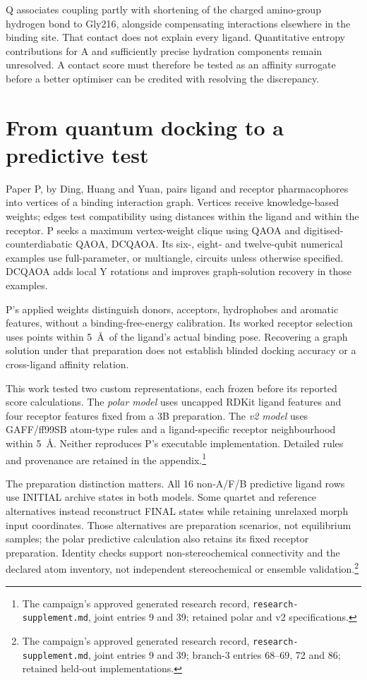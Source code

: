 \documentclass{article}
\newcommand{\rr}[1]{\footnote{The campaign's approved generated research record, \texttt{research-supplement.md}, #1.}}
\begin{document}
Q associates coupling partly with shortening of the charged amino-group hydrogen bond to Gly216, alongside compensating interactions elsewhere in the binding site. That contact does not explain every ligand. Quantitative entropy contributions for A and sufficiently precise hydration components remain unresolved. A contact score must therefore be tested as an affinity surrogate before a better optimiser can be credited with resolving the discrepancy.\cite{Q}

\section{From quantum docking to a predictive test}

Paper P, by Ding, Huang and Yuan, pairs ligand and receptor pharmacophores into vertices of a binding interaction graph. Vertices receive knowledge-based weights; edges test compatibility using distances within the ligand and within the receptor. P seeks a maximum vertex-weight clique using QAOA and digitised-counterdiabatic QAOA, DCQAOA. Its six-, eight- and twelve-qubit numerical examples use full-parameter, or multiangle, circuits unless otherwise specified. DCQAOA adds local Y rotations and improves graph-solution recovery in those examples.\cite{P}

P's applied weights distinguish donors, acceptors, hydrophobes and aromatic features, without a binding-free-energy calibration. Its worked receptor selection uses points within 5~\AA\ of the ligand's actual binding pose. Recovering a graph solution under that preparation does not establish blinded docking accuracy or a cross-ligand affinity relation.\cite{P}

This work tested two custom representations, each frozen before its reported score calculations. The \emph{polar model} uses uncapped RDKit ligand features and four receptor features fixed from a 3B preparation. The \emph{v2 model} uses GAFF/ff99SB atom-type rules and a ligand-specific receptor neighbourhood within 5~\AA. Neither reproduces P's executable implementation. Detailed rules and provenance are retained in the appendix.\rr{joint entries 9 and 39; retained polar and v2 specifications}

The preparation distinction matters. All 16 non-A/F/B predictive ligand rows use INITIAL archive states in both models. Some quartet and reference alternatives instead reconstruct FINAL states while retaining unrelaxed morph input coordinates. Those alternatives are preparation scenarios, not equilibrium samples; the polar predictive calculation also retains its fixed receptor preparation. Identity checks support non-stereochemical connectivity and the declared atom inventory, not independent stereochemical or ensemble validation.\rr{joint entries 9 and 39; branch-3 entries 68--69, 72 and 86; retained held-out implementations}
\end{document}
